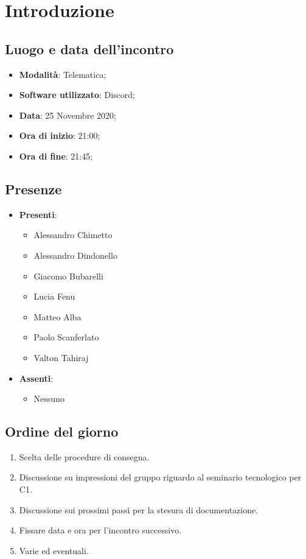\documentclass[]{article}
\begin{document}
	
	
	
	\newpage
	
	\section{Introduzione}
	\subsection{Luogo e data dell'incontro}
	\begin{itemize}
		\item \textbf{Modalità}: Telematica;
		\item \textbf{Software utilizzato}: Discord;
		\item \textbf{Data}: 25 Novembre 2020;
		\item \textbf{Ora di inizio}: 21:00;
		\item \textbf{Ora di fine}: 21:45;
	\end{itemize}
	
	\subsection{Presenze}
	\begin{itemize}
		\item \textbf{Presenti}: 
		\begin{itemize}
			\item Alessandro Chimetto
			\item Alessandro Dindonello
			\item Giacomo Bubarelli
			\item Lucia Fenu
			\item Matteo Alba
			\item Paolo Scanferlato
			\item Valton Tahiraj
		\end{itemize}
		\item \textbf{Assenti}:
		\begin{itemize}
			\item Nessuno
		\end{itemize}
	\end{itemize}
	
	
	\subsection{Ordine del giorno}
	\begin{enumerate}
		\item Scelta delle procedure di consegna.
		\item Discussione su impressioni del gruppo riguardo al seminario
		tecnologico per C1.
		\item Discussione sui prossimi passi per la stesura di documentazione.
		\item Fissare data e ora per l'incontro successivo.
		\item Varie ed eventuali.
	\end{enumerate}
	
\end{document}
